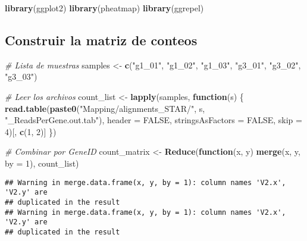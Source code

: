 \documentclass[
]{article}
\newenvironment{Shaded}{\begin{snugshade}}{\end{snugshade}}
\newcommand{\AttributeTok}[1]{\textcolor[rgb]{0.13,0.29,0.53}{#1}}
\newcommand{\CommentTok}[1]{\textcolor[rgb]{0.56,0.35,0.01}{\textit{#1}}}
\newcommand{\ConstantTok}[1]{\textcolor[rgb]{0.56,0.35,0.01}{#1}}
\newcommand{\ControlFlowTok}[1]{\textcolor[rgb]{0.13,0.29,0.53}{\textbf{#1}}}
\newcommand{\DecValTok}[1]{\textcolor[rgb]{0.00,0.00,0.81}{#1}}
\newcommand{\FunctionTok}[1]{\textcolor[rgb]{0.13,0.29,0.53}{\textbf{#1}}}
\newcommand{\NormalTok}[1]{#1}
\newcommand{\OtherTok}[1]{\textcolor[rgb]{0.56,0.35,0.01}{#1}}
\newcommand{\StringTok}[1]{\textcolor[rgb]{0.31,0.60,0.02}{#1}}
\begin{document}
\begin{Shaded}
\begin{Highlighting}[]
\FunctionTok{library}\NormalTok{(ggplot2)}
\FunctionTok{library}\NormalTok{(pheatmap)}
\FunctionTok{library}\NormalTok{(ggrepel)}
\end{Highlighting}
\end{Shaded}

\subsection{Construir la matriz de
conteos}\label{construir-la-matriz-de-conteos}

\begin{Shaded}
\begin{Highlighting}[]
\CommentTok{\# Lista de muestras}
\NormalTok{samples }\OtherTok{\textless{}{-}} \FunctionTok{c}\NormalTok{(}\StringTok{"g1\_01"}\NormalTok{, }\StringTok{"g1\_02"}\NormalTok{, }\StringTok{"g1\_03"}\NormalTok{, }\StringTok{"g3\_01"}\NormalTok{, }\StringTok{"g3\_02"}\NormalTok{, }\StringTok{"g3\_03"}\NormalTok{)}

\CommentTok{\# Leer los archivos}
\NormalTok{count\_list }\OtherTok{\textless{}{-}} \FunctionTok{lapply}\NormalTok{(samples, }\ControlFlowTok{function}\NormalTok{(s) \{}
  \FunctionTok{read.table}\NormalTok{(}\FunctionTok{paste0}\NormalTok{(}\StringTok{"Mapping/alignments\_STAR/"}\NormalTok{, s, }\StringTok{"\_ReadsPerGene.out.tab"}\NormalTok{),}
             \AttributeTok{header =} \ConstantTok{FALSE}\NormalTok{, }\AttributeTok{stringsAsFactors =} \ConstantTok{FALSE}\NormalTok{, }\AttributeTok{skip =} \DecValTok{4}\NormalTok{)[, }\FunctionTok{c}\NormalTok{(}\DecValTok{1}\NormalTok{, }\DecValTok{2}\NormalTok{)]}
\NormalTok{\})}

\CommentTok{\# Combinar por GeneID}
\NormalTok{count\_matrix }\OtherTok{\textless{}{-}} \FunctionTok{Reduce}\NormalTok{(}\ControlFlowTok{function}\NormalTok{(x, y) }\FunctionTok{merge}\NormalTok{(x, y, }\AttributeTok{by =} \DecValTok{1}\NormalTok{), count\_list)}
\end{Highlighting}
\end{Shaded}

\begin{verbatim}
## Warning in merge.data.frame(x, y, by = 1): column names 'V2.x', 'V2.y' are
## duplicated in the result
## Warning in merge.data.frame(x, y, by = 1): column names 'V2.x', 'V2.y' are
## duplicated in the result
\end{verbatim}
\end{document}
